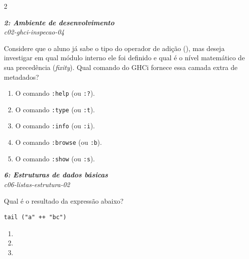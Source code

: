 \documentclass[a4paper,10pt,brazil]{article}
\begin{document}
\begin{multicols}{2}
\begin{enumerate}
\end{enumerate}

\begin{flushright}
  \footnotesize
  \textit{\textbf{2: Ambiente de desenvolvimento}}\\
  \textit{c02-ghci-inspecao-04}\\

\end{flushright}
Considere que o aluno já sabe o tipo do operador de adição (\haskellinline{+}), mas deseja investigar em qual módulo interno ele foi definido e qual é o nível matemático de sua precedência (\emph{fixity}). Qual comando do GHCi fornece essa camada extra de metadados?

\begin{enumerate}
  \item O comando \texttt{:help} (ou \texttt{:?}).

  \item O comando \texttt{:type} (ou \texttt{:t}).

  \item O comando \texttt{:info} (ou \texttt{:i}).

  \item O comando \texttt{:browse} (ou \texttt{:b}).

  \item O comando \texttt{:show} (ou \texttt{:s}).


\end{enumerate}

\begin{flushright}
  \footnotesize
  \textit{\textbf{6: Estruturas de dados básicas}}\\
  \textit{c06-listas-estrutura-02}\\

\end{flushright}
Qual é o resultado da expressão abaixo?
\begin{verbatim}
tail ("a" ++ "bc")
\end{verbatim}

\begin{enumerate}
  \item {}

  \item {}

  \item {}


\end{enumerate}
\end{multicols}
\end{document}
